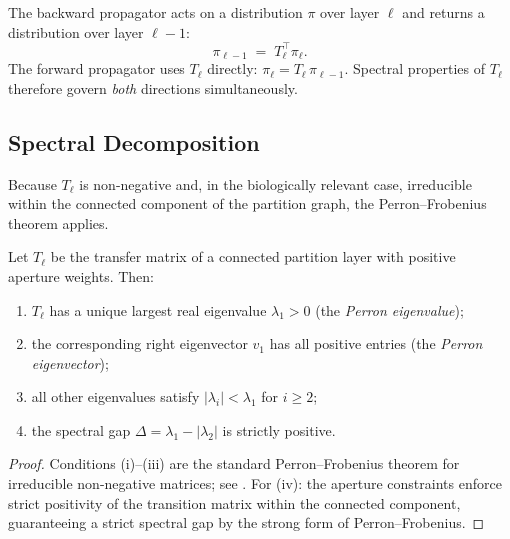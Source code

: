 \begin{remark}
The backward propagator acts on a distribution $\pi$ over layer $\ell$ and
returns a distribution over layer $\ell - 1$:
\[
    \pi_{\ell-1} \;=\; T_\ell^\top \pi_\ell.
\]
The forward propagator uses $T_\ell$ directly: $\pi_\ell = T_\ell\, \pi_{\ell-1}$.
Spectral properties of $T_\ell$ therefore govern \emph{both} directions
simultaneously.
\end{remark}

\subsection{Spectral Decomposition}

Because $T_\ell$ is non-negative and, in the biologically relevant case,
irreducible within the connected component of the partition graph, the
Perron--Frobenius theorem applies.

\begin{theorem}
\label{thm:ch05-pf}
Let $T_\ell$ be the transfer matrix of a connected partition layer with
positive aperture weights.  Then:
\begin{enumerate}
\item[(i)] $T_\ell$ has a unique largest real eigenvalue $\lambda_1 > 0$
    (the \emph{Perron eigenvalue});
\item[(ii)] the corresponding right eigenvector $v_1$ has all positive
    entries (the \emph{Perron eigenvector});
\item[(iii)] all other eigenvalues satisfy $|\lambda_i| < \lambda_1$ for
    $i \geq 2$;
\item[(iv)] the spectral gap $\Delta = \lambda_1 - |\lambda_2|$ is
    strictly positive.
\end{enumerate}
\end{theorem}

\begin{proof}
Conditions (i)--(iii) are the standard Perron--Frobenius theorem for
irreducible non-negative matrices; see \cite{Horn2013}.  For (iv): the
aperture constraints enforce strict positivity of the transition matrix
within the connected component, guaranteeing a strict spectral gap by
the strong form of Perron--Frobenius.
\end{proof}

